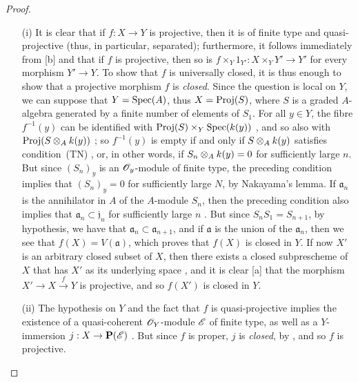 \begin{proof}
\medskip\noindent
\begin{enumerate}
  \item[(i)] It is clear that if $f:X\to Y$ is projective, then it is of finite type and quasi-projective (thus, in particular, separated); furthermore, it follows immediately from [b] and  that if $f$ is projective, then so is $f\times_Y 1_{Y'}:X\times_Y Y'\to Y'$ for every morphism $Y'\to Y$.
     To show that $f$ is universally closed, it is thus enough to show that a projective morphism $f$ is \emph{closed}.
     Since the question is local on $Y$, we can suppose that $Y=\operatorname{Spec}(A)$, thus  $X=\operatorname{Proj}(S)$, where $S$ is a graded $A$-algebra generated by a finite number of elements of $S_1$.
     For all $y\in Y$, the fibre $f^{-1}(y)$ can be identified with $\operatorname{Proj}(S)\times_Y\operatorname{Spec}(k(y))$ , and so also with $\operatorname{Proj}(S\otimes_Ak(y))$ ;
     so $f^{-1}(y)$ is empty if and only if $S\otimes_Ak(y)$ satisfies condition~(TN) , or, in other words, if $S_n\otimes_Ak(y)=0$ for sufficiently large $n$.
     But since $(S_n)_y$ is an $\mathscr{O}_y$-module of finite type, the preceding condition implies that $(S_n)_y=0$ for sufficiently large $N$, by Nakayama's lemma.
     If $\mathfrak{a}_n$ is the annihilator in $A$ of the $A$-module $S_n$, then the preceding condition also implies that $\mathfrak{a}_n\subset\mathfrak{j}_n$ for sufficiently large $n$ .
     But since $S_nS_1=S_{n+1}$, by hypothesis, we have that $\mathfrak{a}_n\subset\mathfrak{a}_{n+1}$, and if $\mathfrak{a}$ is the union of the $\mathfrak{a}_n$, then we see that $f(X)=V(\mathfrak{a})$, which proves that $f(X)$ is closed in $Y$.
     If now $X'$ is an arbitrary closed subset of $X$, then there exists a closed subprescheme of $X$ that has $X'$ as its underlying space , and it is clear [a] that the morphism $X'\to X\xrightarrow{f}Y$ is projective, and so $f(X')$ is closed in $Y$.
   \item[(ii)] The hypothesis on $Y$ and the fact that $f$ is quasi-projective implies the existence of a quasi-coherent $\mathscr{O}_Y$-module $\mathscr{E}$ of finite type, as well as a $Y$-immersion $j:X\to\bb{P}(\sh{E})$ .
      But since $f$ is proper, $j$ is \emph{closed}, by , and so $f$ is projective.
\end{enumerate}
\end{proof}

